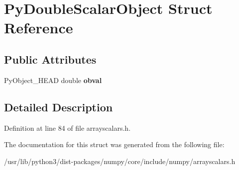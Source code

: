 \hypertarget{structPyDoubleScalarObject}{}\section{Py\+Double\+Scalar\+Object Struct Reference}
\label{structPyDoubleScalarObject}
\subsection*{Public Attributes}
\begin{DoxyCompactItemize}
\item 
Py\+Object\+\_\+\+H\+E\+AD double {\bfseries obval}\hypertarget{structPyDoubleScalarObject_a34c69251a2327a2a4ffb932da026a65c}{}\label{structPyDoubleScalarObject_a34c69251a2327a2a4ffb932da026a65c}

\end{DoxyCompactItemize}


\subsection{Detailed Description}


Definition at line 84 of file arrayscalars.\+h.



The documentation for this struct was generated from the following file\+:\begin{DoxyCompactItemize}
\item 
/usr/lib/python3/dist-\/packages/numpy/core/include/numpy/arrayscalars.\+h\end{DoxyCompactItemize}
